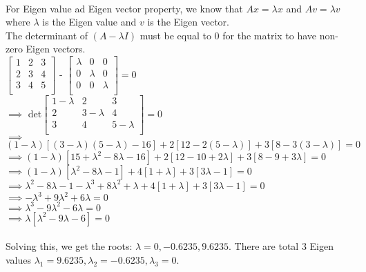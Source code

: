 \documentclass{article}
\begin{document}
\\
For Eigen value ad Eigen vector property, we know that $Ax = {\lambda}x$ and $Av = {\lambda}v$ where ${\lambda}$ is the Eigen value and $v$ is the Eigen vector.\\
The determinant of $(A - {\lambda}I)$ must be equal to 0 for the matrix to have non-zero Eigen vectors.\\
$\begin{bmatrix}
1   &     2&       3\\
   2  &  3    &    4\\
    3  &  4 &   5 \\
\end{bmatrix}$  - $\begin{bmatrix}
{\lambda}   &     0&       0\\
   0  &  {\lambda}    &    0\\
    0  &  0 &   {\lambda}\\
\end{bmatrix} = 0$\\
$\implies$ det$\begin{bmatrix}
1 - {\lambda}   &     2&       3\\
   2  &  3 - {\lambda}    &    4\\
    3  &  4 &   5 - {\lambda} \\
\end{bmatrix}  = 0$\\
$\implies$ $(1 - {\lambda})[(3 - {\lambda})(5 - {\lambda}) - 16] + 2[12 - 2(5 - {\lambda})] + 3[8 - 3(3 - {\lambda})] = 0$\\
$\implies (1 - {\lambda})[15 + {\lambda}^2 - 8{\lambda} - 16] + 2[12 - 10 + 2{\lambda}] + 3[8 - 9 + 3{\lambda}] = 0$\\
$\implies (1 - {\lambda})[{\lambda}^2 - 8{\lambda} - 1] + 4[1 + {\lambda}] + 3[3{\lambda} - 1] = 0$\\
$\implies {\lambda}^2 - 8{\lambda} - 1 - {\lambda}^3 + 8{\lambda}^2 + {\lambda} + 4[1 + {\lambda}] + 3[3{\lambda} - 1]  = 0$\\
$\implies - {\lambda}^3 + 9{\lambda}^2 + 6{\lambda} = 0$\\
$\implies {\lambda}^3 - 9{\lambda}^2 - 6{\lambda} = 0$\\
$\implies {\lambda}[{\lambda}^2 - 9{\lambda} - 6] = 0$\\
\\
Solving this, we get the roots: ${\lambda} = 0, -0.6235, 9.6235$.
There are total 3 Eigen values ${\lambda}_1 = 9.6235, {\lambda}_2 = -0.6235, {\lambda}_3 = 0$.\\
\end{document}
